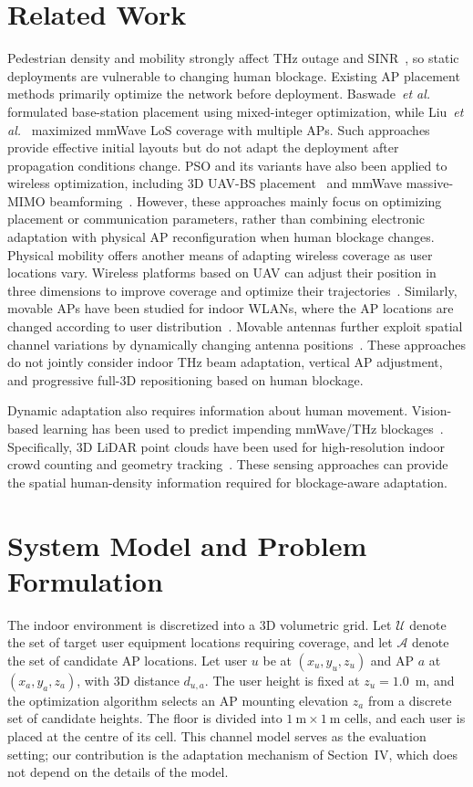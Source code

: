 \documentclass[conference]{IEEEtran}
\begin{document}
	\section{Related Work}

	Pedestrian density and mobility strongly affect THz outage and SINR~\cite{b14}, so static deployments are vulnerable to changing human blockage. Existing AP placement methods primarily optimize the network before
	deployment. Baswade~\textit{et al.}~\cite{b4} formulated base-station
	placement using mixed-integer optimization, while Liu~\textit{et al.}~\cite{b7}
	maximized mmWave LoS coverage with multiple APs. Such approaches provide effective initial layouts but do
	not adapt the deployment after propagation conditions change. PSO and
	its variants have also been applied to wireless optimization,
	including 3D UAV-BS placement~\cite{b15} and mmWave massive-MIMO
	beamforming~\cite{b16}. However, these approaches mainly focus on optimizing placement or communication parameters, rather than combining electronic adaptation with physical AP reconfiguration when human blockage changes.
	Physical mobility offers another means of adapting wireless coverage as user locations vary. Wireless platforms based on UAV can adjust their position in three dimensions to improve coverage and optimize their trajectories~\cite{b15,b20}. Similarly, movable APs have been studied for indoor WLANs, where the AP locations are changed according to user distribution~\cite{b21}. Movable antennas further exploit spatial channel variations by dynamically changing antenna positions~\cite{b22}. These approaches do not jointly consider
	indoor THz beam adaptation, vertical AP adjustment, and progressive
	full-3D repositioning based on human blockage.

	Dynamic adaptation also requires information about human
	movement. Vision-based learning has been used to predict impending
	mmWave/THz blockages~\cite{b25}.
	Specifically, 3D LiDAR point clouds have been used for high-resolution indoor crowd counting and geometry tracking~\cite{b27,b29}. These sensing approaches can provide the spatial
	human-density information required for blockage-aware adaptation.

	\section{System Model and Problem Formulation}

	The indoor environment is discretized into a 3D volumetric grid. Let $\mathcal{U}$ denote the set of target user equipment locations requiring coverage, and let $\mathcal{A}$ denote the set of candidate AP locations. Let user $u$ be at $(x_u, y_u, z_u)$ and AP $a$ at $(x_a, y_a, z_a)$, with 3D distance $d_{u,a}$. The user height is fixed at $z_u = 1.0$~m, and the optimization algorithm selects an AP mounting elevation $z_a$ from a discrete set of candidate heights. The floor is divided into $1~\text{m} \times 1~\text{m}$ cells, and each user is placed at the centre of its cell. This channel model serves as the evaluation setting; our contribution is the adaptation mechanism of Section~IV, which does not depend on the details of the model.
\end{document}
